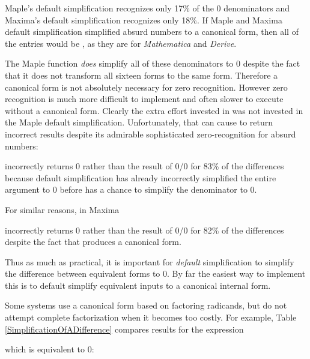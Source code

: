 \documentclass[12pt,english]{article}
\theoremstyle{definition}
\theoremstyle{remark}
\theoremstyle{plain}
\theoremstyle{plain}
\begin{document}
Maple's default simplification recognizes only 17\% of the 0 denominators
and Maxima's default simplification recognizes only 18\%. If Maple
and Maxima default simplification simplified absurd numbers to a canonical
form, then all of the entries would be , as they are
for \textsl{Mathematica} and \textsl{Derive}.

The Maple  function \textsl{does} simplify
all of these denominators to 0 despite the fact that it does not transform
all sixteen forms to the same form. Therefore a canonical form is
not absolutely necessary for zero recognition. However zero recognition
is much more difficult to implement and often slower to execute without
a canonical form. Clearly the extra effort invested in 
was not invested in the Maple default simplification. Unfortunately,
that can cause  to return incorrect results
despite its admirable sophisticated zero-recognition for absurd numbers:

incorrectly returns 0 rather than the result of 0/0 for 83\% of the
differences because default simplification has already incorrectly
simplified the entire argument to 0 before 
has a chance to simplify the denominator to 0.

For similar reasons, in Maxima

incorrectly returns 0 rather than the result of 0/0 for 82\% of the
differences despite the fact that 
produces a canonical form.

Thus as much as practical, it is important for \textsl{default} simplification
to simplify the difference between equivalent forms to 0. By far the
easiest way to implement this is to default simplify equivalent inputs
to a canonical internal form.

Some systems use a canonical form based on factoring radicands, but
do not attempt complete factorization when it becomes too costly.
For example, Table \ref{SimplificationOfADifference} compares results
for the expression

\vspace{-0.6em}
which is equivalent to 0:
\end{document}
